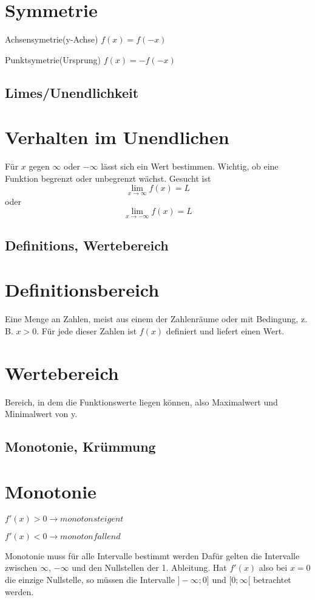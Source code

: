 \section*{Symmetrie}
Achsensymetrie(y-Achse) $f(x) = f(-x)$

Punktsymetrie(Ursprung) $f(x) = -f(-x)$

\subsection{Limes/Unendlichkeit}

\section*{Verhalten im Unendlichen}
Für $x$ gegen $\infty$ oder $-\infty$ lässt sich ein Wert bestimmen.
Wichtig, ob eine Funktion begrenzt oder unbegrenzt wächst.
Gesucht ist \[\lim _{x \to \infty} f(x) = L\] oder \[\lim _{x \to -\infty} f(x) = L\]

\subsection{Definitions, Wertebereich}

\section*{Definitionsbereich}
Eine Menge an Zahlen, meist aus einem der Zahlenräume oder mit Bedingung, z. B. $x > 0$. Für jede dieser Zahlen
ist $f(x)$ definiert und liefert einen Wert.

\section*{Wertebereich}
Bereich, in dem die Funktionswerte liegen können, also Maximalwert und Minimalwert von y.

\subsection{Monotonie, Krümmung}

\section*{Monotonie}
$f'(x) > 0 \rightarrow monoton steigent$

$f'(x) < 0 \rightarrow monoton fallend$

Monotonie muss für alle Intervalle bestimmt werden
Dafür gelten die Intervalle zwischen $\infty$, $-\infty$ und den Nullstellen der 1. Ableitung.
Hat $f'(x)$ also bei $x = 0$ die einzige Nullstelle, so müssen die Intervalle $]-\infty;0]$ und $[0;\infty[$
betrachtet werden.

